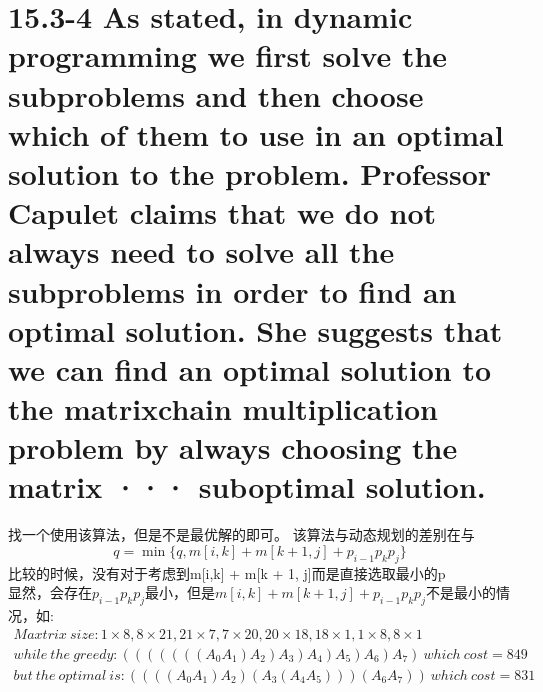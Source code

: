 \documentclass{thuemp}
\begin{document}
\section*{15.3-4 As stated, in dynamic programming we first solve the subproblems and then choose which of them to use in an optimal solution to the problem. Professor Capulet claims that we do not always need to solve all the subproblems in order to find an optimal solution. She suggests that we can find an optimal solution to the matrixchain multiplication problem by always choosing the matrix ··· suboptimal solution.}
找一个使用该算法，但是不是最优解的即可。
该算法与动态规划的差别在与
\[ q =\min\{ q,m[i,k] + m[k + 1, j] + p_{i-1}p_kp_j\}\]
比较的时候，没有对于考虑到m[i,k] + m[k + 1, j]而是直接选取最小的p\\
显然，会存在$ p_{i-1}p_kp_j$最小，但是$m[i,k] + m[k + 1, j] + p_{i-1}p_kp_j$不是最小的情况，如:
\begin{equation*}
	\begin{split}
	Maxtrix \ size : 1\times 8,8\times 21,21\times 7, 7\times 20, 20\times 18, 18\times 1,1\times 8,8 \times 1\\
	while\ the\ greedy:(((((((A_0A_1)A_2)A_3)A_4)A_5)A_6)A_7)\ which \ cost =849\\
	but\ the \ optimal \ is: ((((A_0A_1)A_2)(A_3(A_4A_5)))(A_6A_7))\ which \ cost =831
\end{split}
\end{equation*}















\newpage

\renewcommand\refname{\heiti\wuhao\centerline{参考文献}\global\def\refname{参考文献}}
\vskip 12pt

\let\OLDthebibliography\thebibliography
\renewcommand\thebibliography[1]{
  \OLDthebibliography{#1}
  \setlength{\parskip}{0pt}
  \setlength{\itemsep}{0pt plus 0.3ex}
}

{
\renewcommand{\baselinestretch}{0.9}
\liuhao


}
\end{document}
